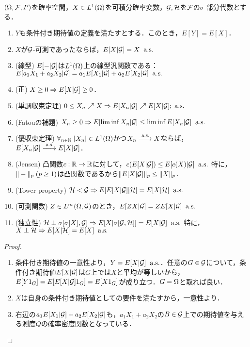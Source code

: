 \documentclass[uplatex,dvipdfmx]{jsreport}
\begin{document}
\begin{proposition}
    $(\Omega,\mathcal{F},P)$を確率空間，$X\in L^1(\Omega)$を可積分確率変数，$\mathcal{G},\mathcal{H}$を$\mathcal{F}$の$\sigma$-部分代数とする．
    \begin{enumerate}
        \item $Y$も条件付き期待値の定義を満たすとする．このとき，$E[Y]=E[X]$．
        \item $X$が$\mathcal{G}$-可測であったならば，$E[X|\mathcal{G}]=X\;\;\mathrm{a.s.}$
        \item (線型) $E[-|\mathcal{G}]$は$L^1(\Omega)$上の線型汎関数である：$E[a_1X_1+a_2X_2|\mathcal{G}]=a_1E[X_1|\mathcal{G}]+a_2E[X_2|\mathcal{G}]\;\;\mathrm{a.s.}$
        \item (正) $X\ge0\Rightarrow E[X|\mathcal{G}]\ge0$．
        \item (単調収束定理) $0\le X_n\nearrow X\Rightarrow E[X_n|\mathcal{G}]\nearrow E[X|\mathcal{G}];\;\mathrm{a.s.}$
        \item (Fatouの補題) $X_n\ge0\Rightarrow E[\liminf X_n|\mathcal{G}]\le\liminf E[X_n|\mathcal{G}]\;\;\mathrm{a.s.}$
        \item (優収束定理) $\forall_{n\in\mathbb{N}}\;\lvert X_n\rvert\in L^1(\Omega)$かつ$X_n\xrightarrow{\;\mathrm{a.s.}}X$ならば，$E[X_n|\mathcal{G}]\xrightarrow{\;\mathrm{a.s.}}E[X|\mathcal{G}]$．
        \item (Jensen) 凸関数$c:\mathbb{R}\to\mathbb{R}$に対して，$c(E[X|\mathcal{G}])\le E[c(X)|\mathcal{G}]\;\;\mathrm{a.s.}$ 特に，$\|-\|_p\;(p\ge1)$は凸関数であるから$\|E[X|\mathcal{G}]\|_p\le\|X\|_p$．
        \item (Tower property) $\mathcal{H}<\mathcal{G}\Rightarrow E[E[X|\mathcal{G}]|\mathcal{H}]=E[X|\mathcal{H}]\;\;\mathrm{a.s.}$
        \item (可測関数) $Z\in L^\infty(\Omega,\mathcal{G})$のとき，$E[ZX|\mathcal{G}]=ZE[X|\mathcal{G}]\;\;\mathrm{a.s.}$
        \item (独立性) $\mathcal{H}\perp\sigma[\sigma[X],\mathcal{G}]\Rightarrow E[X|\sigma[\mathcal{G},\mathcal{H}]]=E[X|\mathcal{G}]\;\;\mathrm{a.s.}$ 特に，$X\perp\mathcal{H}\Rightarrow E[X|\mathcal{H}]=E[X]\;\;\mathrm{a.s.}$
    \end{enumerate}
\end{proposition}
\begin{proof}\mbox{}
    \begin{enumerate}
        \item 条件付き期待値の一意性より，$Y=E[X|\mathcal{G}]\;\;\mathrm{a.s.}$．任意の$G\in\mathcal{G}$について，条件付き期待値$E[X|\mathcal{G}]$は$G$上では$X$と平均が等しいから，
        $E[Y1_G]=E[E[X|\mathcal{G}]1_G]=E[X1_G]$が成り立つ．$G=\Omega$と取れば良い．
        \item $X$は自身の条件付き期待値としての要件を満たすから，一意性より．
        \item 右辺の$a_1E[X_1|\mathcal{G}]+a_2E[X_2|\mathcal{G}]$も，$a_1X_1+a_2X_2$の$B\in\mathcal{G}$上での期待値を与える測度$Q$の確率密度関数となっている．
    \end{enumerate}
\end{proof}
\end{document}
